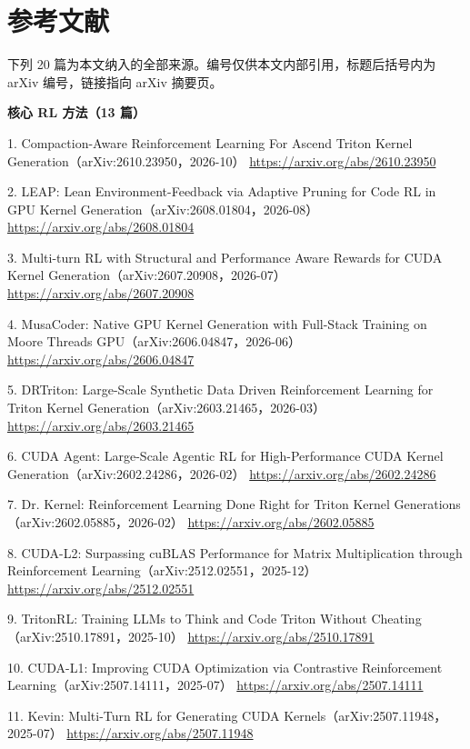 \section{参考文献}
\begin{refs}

下列 20 篇为本文纳入的全部来源。编号仅供本文内部引用，标题后括号内为 arXiv 编号，链接指向 arXiv 摘要页。

\textbf{核心 RL 方法（13 篇）}

1. Compaction-Aware Reinforcement Learning For Ascend Triton Kernel Generation（arXiv:2610.23950，2026-10）  
   \url{https://arxiv.org/abs/2610.23950}

2. LEAP: Lean Environment-Feedback via Adaptive Pruning for Code RL in GPU Kernel Generation（arXiv:2608.01804，2026-08）  
   \url{https://arxiv.org/abs/2608.01804}

3. Multi-turn RL with Structural and Performance Aware Rewards for CUDA Kernel Generation（arXiv:2607.20908，2026-07）  
   \url{https://arxiv.org/abs/2607.20908}

4. MusaCoder: Native GPU Kernel Generation with Full-Stack Training on Moore Threads GPU（arXiv:2606.04847，2026-06）  
   \url{https://arxiv.org/abs/2606.04847}

5. DRTriton: Large-Scale Synthetic Data Driven Reinforcement Learning for Triton Kernel Generation（arXiv:2603.21465，2026-03）  
   \url{https://arxiv.org/abs/2603.21465}

6. CUDA Agent: Large-Scale Agentic RL for High-Performance CUDA Kernel Generation（arXiv:2602.24286，2026-02）  
   \url{https://arxiv.org/abs/2602.24286}

7. Dr. Kernel: Reinforcement Learning Done Right for Triton Kernel Generations（arXiv:2602.05885，2026-02）  
   \url{https://arxiv.org/abs/2602.05885}

8. CUDA-L2: Surpassing cuBLAS Performance for Matrix Multiplication through Reinforcement Learning（arXiv:2512.02551，2025-12）  
   \url{https://arxiv.org/abs/2512.02551}

9. TritonRL: Training LLMs to Think and Code Triton Without Cheating（arXiv:2510.17891，2025-10）  
   \url{https://arxiv.org/abs/2510.17891}

10. CUDA-L1: Improving CUDA Optimization via Contrastive Reinforcement Learning（arXiv:2507.14111，2025-07）  
   \url{https://arxiv.org/abs/2507.14111}

11. Kevin: Multi-Turn RL for Generating CUDA Kernels（arXiv:2507.11948，2025-07）  
   \url{https://arxiv.org/abs/2507.11948}


\end{refs}
